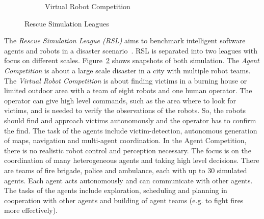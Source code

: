 \begin{figure}
\begin{subfigure}[b]{0.48\textwidth}
    \caption{Virtual Robot Competition~\cite{rescue_simulation_league}}
    \label{fig:rescue_vrc}
  \end{subfigure}
  \caption{Rescue Simulation Leagues}
  \label{fig:rescue}
\end{figure}
The \textit{Rescue Simulation League (RSL)} aims to benchmark intelligent software agents and robots in a disaster scenario~\cite{rescue_simulation_league}. RSL is separated into two leagues with focus on different scales. Figure~\ref{fig:rescue} shows snapshots of both simulation. The \textit{Agent Competition} is about a large scale disaster in a city with multiple robot teams. The \textit{Virtual Robot Competition} is about finding victims in a burning house or limited outdoor area with a team of eight robots and one human operator. The operator can give high level commands, such as the area where to look for victims, and is needed to verify the observations of the robots. So, the robots should find and approach victims autonomously and the operator has to confirm the find. The task of the agents include victim-detection, autonomous generation of maps, navigation and multi-agent coordination. In the Agent Competition, there is no realistic robot control and perception necessary. The focus is on the coordination of many heterogeneous agents and taking high level decisions. There are teams of fire brigade, police and ambulance, each with up to 30 simulated agents. Each agent acts autonomously and can communicate with other agents. The tasks of the agents include exploration, scheduling and planning in cooperation with other agents and building of agent teams (e.g. to fight fires more effectively).\\

